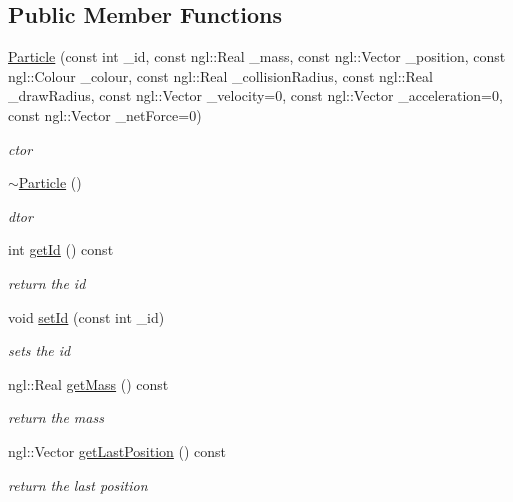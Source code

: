 \subsection*{Public Member Functions}
\begin{DoxyCompactItemize}
\item 
\hyperlink{class_particle_a6210a8af42489bad229736c176f9d1c9}{Particle} (const int \_\-id, const ngl::Real \_\-mass, const ngl::Vector \_\-position, const ngl::Colour \_\-colour, const ngl::Real \_\-collisionRadius, const ngl::Real \_\-drawRadius, const ngl::Vector \_\-velocity=0, const ngl::Vector \_\-acceleration=0, const ngl::Vector \_\-netForce=0)
\begin{DoxyCompactList}\small\item\em ctor \item\end{DoxyCompactList}\item 
\hyperlink{class_particle_ad030d0fe7b88cf81744b127c99244ff4}{$\sim$Particle} ()
\begin{DoxyCompactList}\small\item\em dtor \item\end{DoxyCompactList}\item 
int \hyperlink{class_particle_ad9688047786047c9fecf0c304b4f6294}{getId} () const 
\begin{DoxyCompactList}\small\item\em return the id \item\end{DoxyCompactList}\item 
void \hyperlink{class_particle_a874b156fe77eec11b80075c5708c283c}{setId} (const int \_\-id)
\begin{DoxyCompactList}\small\item\em sets the id \item\end{DoxyCompactList}\item 
ngl::Real \hyperlink{class_particle_a51c37948e3b1e36f812be660c306c93b}{getMass} () const 
\begin{DoxyCompactList}\small\item\em return the mass \item\end{DoxyCompactList}\item 
ngl::Vector \hyperlink{class_particle_aaac2b15b45cd70fddfb6736290458e76}{getLastPosition} () const 
\begin{DoxyCompactList}\small\item\em return the last position \item\end{DoxyCompactList}\item 

\end{DoxyCompactItemize}
